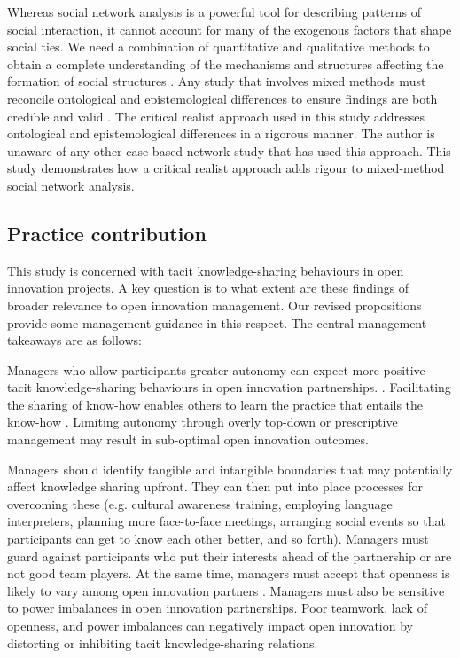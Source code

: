 Whereas social network analysis is a powerful tool for describing patterns of social interaction, it cannot account for many of the exogenous factors that shape social ties. We need a combination of quantitative and qualitative methods to obtain a complete understanding of the mechanisms and structures affecting the formation of social structures \citep{welch2011theorising}. Any study that involves mixed methods must reconcile ontological and epistemological differences to ensure findings are both credible and valid \citep{bhaskar2013realist}. The critical realist approach used in this study addresses ontological and epistemological differences in a rigorous manner. The author is unaware of any other case-based network study that has used this approach. This study demonstrates how a critical realist approach adds rigour to mixed-method social network analysis.

\subsection{Practice contribution}

This study is concerned with tacit knowledge-sharing behaviours in open innovation projects. A key question is to what extent are these findings of broader relevance to open innovation management. Our revised propositions provide some management guidance in this respect. The central management takeaways are as follows: \medskip

Managers who allow participants greater autonomy can expect more positive tacit knowledge-sharing behaviours in open innovation partnerships. \citep{gagne2005self,gagne2009model,longo2017struggling}. Facilitating the sharing of know-how enables others to learn the practice that entails the know-how \citep{cook1999bridging}. Limiting autonomy through overly top-down or prescriptive management may result in sub-optimal open innovation outcomes. \medskip

Managers should identify tangible and intangible boundaries that may potentially affect knowledge sharing upfront. They can then put into place processes for overcoming these (e.g. cultural awareness training, employing language interpreters, planning more face-to-face meetings, arranging social events so that participants can get to know each other better, and so forth). Managers must guard against participants who put their interests ahead of the partnership or are not good team players. At the same time, managers must accept that openness is likely to vary among open innovation partners \citep{dahlander2010open}. Managers must also be sensitive to power imbalances in open innovation partnerships. Poor teamwork, lack of openness, and power imbalances can negatively impact open innovation by distorting or inhibiting tacit knowledge-sharing relations.  \medskip

